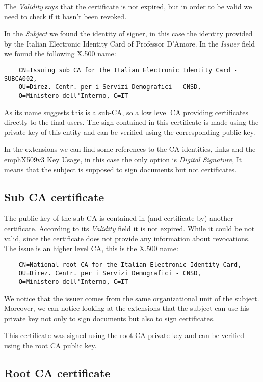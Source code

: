 \documentclass{article}
\begin{document}
The \emph{Validity} says that the certificate is not expired, but in order to be valid
we need to check if it hasn't been revoked.

In the \emph{Subject} we found the identity of signer, in this case the 
identity provided by the Italian Electronic Identity Card of Professor D'Amore.
In the \emph{Issuer} field we found the following X.500 name:
\begin{verbatim}
	CN=Issuing sub CA for the Italian Electronic Identity Card - SUBCA002, 
	OU=Direz. Centr. per i Servizi Demografici - CNSD, 
	O=Ministero dell'Interno, C=IT
\end{verbatim}

As its name suggests this is a sub-CA, so a low level CA providing certificates
directly to the final users. The sign contained in this certificate is made
using the private key of this entity and can be verified using the corresponding public key.

In the extensions we can find some references to the CA identities, links
and the emph{X509v3 Key Usage}, in this case the only option is
\emph{Digital Signature}, It means that the subject is supposed to sign documents
but not certificates.

\subsection{Sub CA certificate}

The public key of the sub CA is contained in (and certificate by) another certificate.
According to its \emph{Validity} field it is not expired. While it could be not valid,
since the certificate does not provide any information about revocations.
The issue is an higher level CA, this is the X.500 name:
\begin{verbatim}
	CN=National root CA for the Italian Electronic Identity Card, 
	OU=Direz. Centr. per i Servizi Demografici - CNSD, 
	O=Ministero dell'Interno, C=IT
\end{verbatim}

We notice that the issuer comes from the same organizational unit of the subject.
Moreover, we can notice looking at the extensions that the subject
can use his private key not only to sign documents but also to sign certificates.

This certificate was signed using the root CA private key and can be verified
using the  root CA  public key.

\subsection{Root CA certificate}
\end{document}
